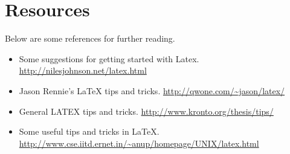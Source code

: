 \section{Resources}

Below are some references for further reading.

\begin{itemize}
\item
Some suggestions for getting started with Latex. \url{http://nilesjohnson.net/latex.html}

\item
Jason Rennie's LaTeX tips and tricks. \url{http://qwone.com/~jason/latex/}

\item
General LATEX tips and tricks. \url{http://www.kronto.org/thesis/tips/}

\item
Some useful tips and tricks in LaTeX. \url{http://www.cse.iitd.ernet.in/~anup/homepage/UNIX/latex.html}

\end{itemize}
